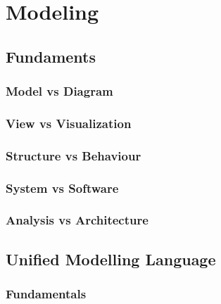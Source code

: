 \chapter{Modeling}


\section{Fundaments}


\subsection{Model vs Diagram}


\subsection{View vs Visualization}


\subsection{Structure vs Behaviour}


\subsection{System vs Software}


\subsection{Analysis vs Architecture}


\section{Unified Modelling Language}


\subsection{Fundamentals}

